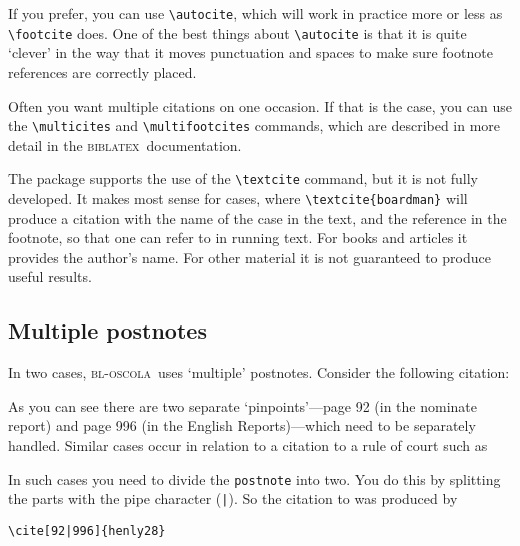 \documentclass[a5paper,fontsize=9pt,DIV=1]{scrartcl}
\newcommand{\oscola}{\textsc{bl-oscola}}
\newcommand{\biblatex}{\textsc{biblatex}}
\newcounter{egcounter}\setcounter{egcounter}{0}
\newenvironment{bibexample}[1][]{%
  \medskip\par\small\noindent\ignorespaces
  \marginpar{[\refstepcounter{egcounter}\arabic{egcounter}]\label{#1}}
  \begin{minipage}[t]{0.95\linewidth}}
 {\end{minipage}\par\medskip}
\begin{document}
If you prefer, you can use \verb|\autocite|, which will work in
practice more or less as \verb|\footcite| does.
One of the best things about
\verb|\autocite| is that it is quite `clever' in the way that it moves
punctuation and spaces to make sure footnote references are correctly
placed.

Often you want multiple citations on one occasion. If that is the
case, you can use the \verb|\multicites| and \verb|\multifootcites|
commands, which are described in more detail in the \biblatex\
documentation.

The package supports the use of the \verb|\textcite| command, but it is not fully developed. It makes most sense for cases, where \verb|\textcite{boardman}| will produce a citation with the name of the case in the text, and the reference in the footnote, so that one can refer to \textcite{boardman} in running text. For books and articles it provides the author's name. For other material it is not guaranteed to produce useful results.



\subsection{Multiple postnotes}
 In two cases, \oscola\ uses `multiple' postnotes. Consider the following citation:
\begin{center}
\cite[92|996]{henly28}
\end{center}
As you can see there are two separate `pinpoints'---{}page 92 (in the nominate report) and page 996 (in the English Reports){}---which need to be separately handled. Similar cases occur in relation to a citation to a rule of court such as
\begin{center}
\cite[11|6]{rsc}
\end{center} 

In such cases you need to divide the \texttt{postnote} into two. You do this by splitting the parts with the pipe character (\verb=|=). So the citation to  was produced by
\begin{bibexample}[doublepostnote]
\begin{verbatim}
\cite[92|996]{henly28}
\end{verbatim}
\end{bibexample}
\end{document}

